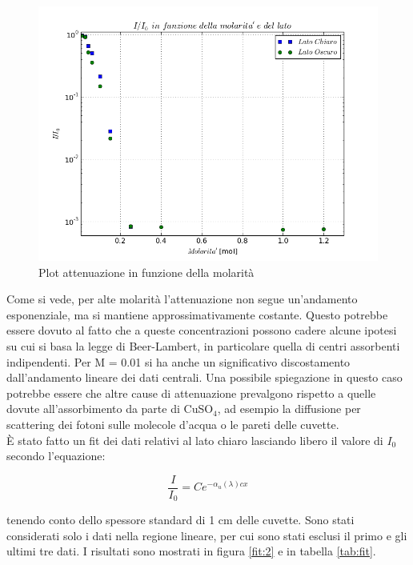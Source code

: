 \documentclass[a4paper]{article}
\begin{document}
\begin{figure}[htp]
\centering
\includegraphics[scale=.6]{plotpowerrel}
\caption{Plot attenuazione in funzione della molarità}
\label{fig:att}
\end{figure}

Come si vede, per alte molarità l'attenuazione non segue un'andamento esponenziale, ma si mantiene approssimativamente costante. Questo potrebbe essere dovuto al fatto che a queste concentrazioni possono cadere alcune ipotesi su cui si basa la legge di Beer-Lambert, in particolare quella di centri assorbenti indipendenti. Per M = 0.01 si ha anche un significativo discostamento dall'andamento lineare dei dati centrali. Una possibile spiegazione in questo caso potrebbe essere che altre cause di attenuazione prevalgono rispetto a quelle dovute all'assorbimento da parte di CuSO$_4$, ad esempio la diffusione per scattering dei fotoni sulle molecole d'acqua o le pareti delle cuvette.\\
È stato fatto un fit dei dati relativi al lato chiaro lasciando libero il valore di $I_0$ secondo l'equazione:

\begin{equation}
\frac{I}{I_0}=C e^{- \alpha _u (\lambda) c x}
\end{equation}

tenendo conto dello spessore standard di 1 cm delle cuvette. Sono stati considerati solo i dati nella regione lineare, per cui sono stati esclusi il primo e gli ultimi tre dati. I risultati sono mostrati in figura \ref{fit:2} e in tabella \ref{tab:fit}.
\end{document}
